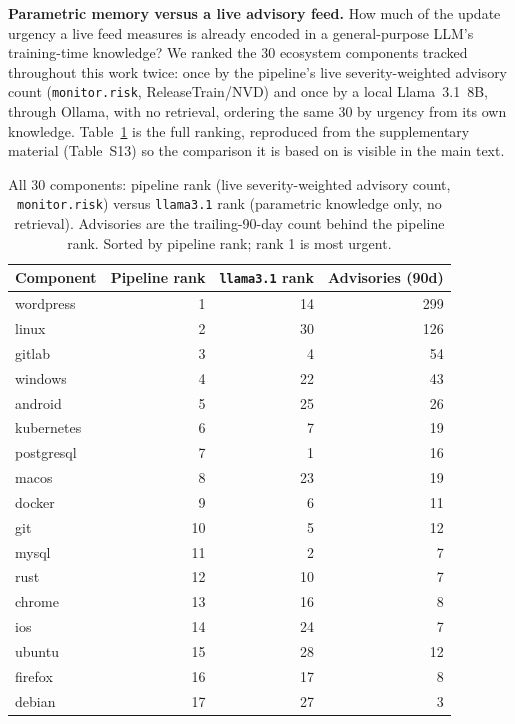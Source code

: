 \documentclass[10pt,conference]{IEEEtran}
\begin{document}
\textbf{Parametric memory versus a live advisory feed.}\label{sec:update-order-baseline}
How much of the update urgency a live feed measures is already encoded in a
general-purpose LLM's training-time knowledge? We ranked the 30 ecosystem
components tracked throughout this work twice: once by the pipeline's live
severity-weighted advisory count (\texttt{monitor.risk}, ReleaseTrain/NVD) and
once by a local Llama~3.1~8B, through Ollama, with no retrieval, ordering the
same 30 by urgency from its own knowledge. Table~\ref{tab:ranking} is the full
ranking, reproduced from the supplementary material (Table~S13) so the
comparison it is based on is visible in the main text.

\begin{table}[t]
\caption{All 30 components: pipeline rank (live severity-weighted advisory
count, \texttt{monitor.risk}) versus \texttt{llama3.1} rank (parametric
knowledge only, no retrieval). Advisories are the trailing-90-day count
behind the pipeline rank. Sorted by pipeline rank; rank 1 is most urgent.}
\label{tab:ranking}
\centering
\footnotesize
\setlength{\tabcolsep}{3.5pt}
\begin{tabular}{@{}lrrr@{}}
\toprule
Component & Pipeline rank & \texttt{llama3.1} rank & Advisories (90d) \\
\midrule
wordpress      & 1  & 14 & 299 \\
linux          & 2  & 30 & 126 \\
gitlab         & 3  & 4  & 54  \\
windows        & 4  & 22 & 43  \\
android        & 5  & 25 & 26  \\
kubernetes     & 6  & 7  & 19  \\
postgresql     & 7  & 1  & 16  \\
macos          & 8  & 23 & 19  \\
docker         & 9  & 6  & 11  \\
git            & 10 & 5  & 12  \\
mysql          & 11 & 2  & 7   \\
rust           & 12 & 10 & 7   \\
chrome         & 13 & 16 & 8   \\
ios            & 14 & 24 & 7   \\
ubuntu         & 15 & 28 & 12  \\
firefox        & 16 & 17 & 8   \\
debian         & 17 & 27 & 3   \\

\end{tabular}
\end{table}
\end{document}
